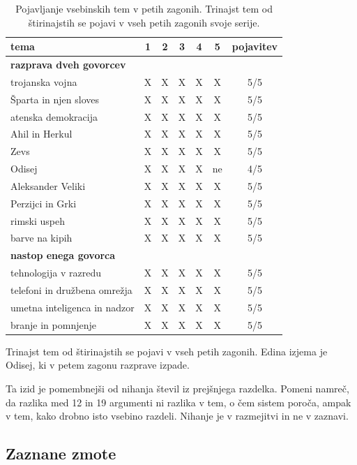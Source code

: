 \documentclass[a4paper, 12pt]{book}
\begin{document}
\begin{table}[H]
\centering
\begin{tabular}{lccccc c}
\toprule
tema & 1 & 2 & 3 & 4 & 5 & pojavitev \\
\midrule
\multicolumn{7}{l}{\textbf{razprava dveh govorcev}} \\
trojanska vojna              & X & X & X & X & X & 5/5 \\
Šparta in njen sloves        & X & X & X & X & X & 5/5 \\
atenska demokracija          & X & X & X & X & X & 5/5 \\
Ahil in Herkul               & X & X & X & X & X & 5/5 \\
Zevs                         & X & X & X & X & X & 5/5 \\
Odisej                       & X & X & X & X & ne & 4/5 \\
Aleksander Veliki            & X & X & X & X & X & 5/5 \\
Perzijci in Grki             & X & X & X & X & X & 5/5 \\
rimski uspeh                 & X & X & X & X & X & 5/5 \\
barve na kipih               & X & X & X & X & X & 5/5 \\
\midrule
\multicolumn{7}{l}{\textbf{nastop enega govorca}} \\
tehnologija v razredu        & X & X & X & X & X & 5/5 \\
telefoni in družbena omrežja & X & X & X & X & X & 5/5 \\
umetna inteligenca in nadzor & X & X & X & X & X & 5/5 \\
branje in pomnjenje          & X & X & X & X & X & 5/5 \\
\bottomrule
\end{tabular}
\caption{Pojavljanje vsebinskih tem v petih zagonih. Trinajst tem od
štirinajstih se pojavi v vseh petih zagonih svoje serije.}
\label{tbl:ujemanje}
\end{table}

Trinajst tem od štirinajstih se pojavi v vseh petih zagonih. Edina izjema je
Odisej, ki v petem zagonu razprave izpade.

Ta izid je pomembnejši od nihanja števil iz prejšnjega razdelka. Pomeni namreč,
da razlika med 12 in 19 argumenti ni razlika v tem, o čem sistem poroča, ampak v
tem, kako drobno isto vsebino razdeli. Nihanje je v razmejitvi in ne v zaznavi.

\subsection{Zaznane zmote}
\label{sec:zmote-meritev}
\end{document}
